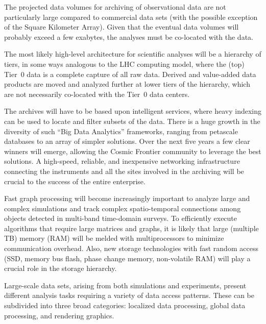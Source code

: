 The projected data volumes for archiving of observational data are not
particularly large compared to commercial data sets (with the possible
exception of the Square Kilometer Array). Given that the eventual data
volumes will probably exceed a few exabytes, the analyses must be
co-located with the data.

The most likely high-level architecture for scientific analyses will
be a hierarchy of tiers, in some ways analogous to the LHC computing
model, where the (top) Tier~0 data is a complete capture of all raw data.
Derived and value-added data products are moved and analyzed
further at lower tiers of the hierarchy, which are not necessarily
co-located with the Tier~0 data centers.

The archives will have to be based upon intelligent services, where
heavy indexing can be used to locate and filter subsets of the
data. There is a huge growth in the diversity of such ``Big Data
Analytics'' frameworks, ranging from petascale databases to an array
of simpler solutions. Over the next five years a few clear winners
will emerge, allowing the Cosmic Frontier community to leverage the
best solutions. A high-speed, reliable, and inexpensive networking
infrastructure connecting the instruments and all the sites involved
in the archiving will be crucial to the success of the entire
enterprise.

Fast graph processing will become increasingly important to analyze
large and complex simulations and track complex spatio-temporal
connections among objects detected in multi-band time-domain
surveys. To efficiently execute algorithms that require large matrices
and graphs, it is likely that large (multiple TB) memory (RAM) will be
melded with multiprocessors to minimize communication overhead. Also,
new storage technologies with fast random access (SSD, memory bus
flash, phase change memory, non-volatile RAM) will play a crucial role
in the storage hierarchy.

Large-scale data sets, arising from both simulations and experiments,
present different analysis tasks requiring a variety of data access
patterns. These can be subdivided into three broad categories:
localized data processing, global data processing, and rendering
graphics.

